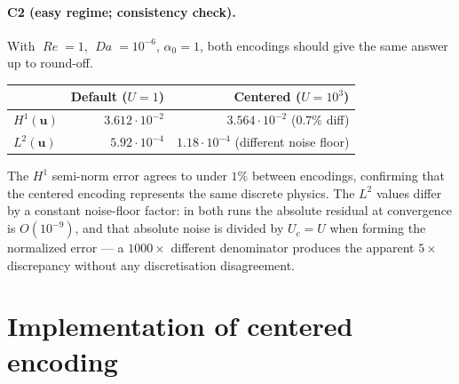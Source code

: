 \documentclass[11pt]{article}
\newcommand{\Reyn}{\operatorname{\mathit{Re}}}
\newcommand{\Damk}{\operatorname{\mathit{Da}}}
\begin{document}
\paragraph{C2 (easy regime; consistency check).}
With $\Reyn=1$, $\Damk=10^{-6}$, $\alpha_0=1$, both encodings should give
the same answer up to round-off.
\begin{center}
\begin{tabular}{lrr}
  \toprule
  & Default ($U=1$) & Centered ($U=10^{3}$) \\
  \midrule
  $H^{1}(\boldsymbol{u})$ & $3.612\cdot10^{-2}$ & $3.564\cdot10^{-2}$ \quad ($0.7\%$ diff) \\
  $L^{2}(\boldsymbol{u})$ & $5.92\cdot10^{-4}$  & $1.18\cdot10^{-4}$  \quad (different noise floor) \\
  \bottomrule
\end{tabular}
\end{center}
\noindent The $H^{1}$ semi-norm error agrees to under $1\%$ between
encodings, confirming that the centered encoding represents the same
discrete physics. The $L^{2}$ values differ by a constant noise-floor
factor: in both runs the absolute residual at convergence is $O(10^{-9})$,
and that absolute noise is divided by $U_c = U$ when forming the
normalized error — a $1000\times$ different denominator produces the
apparent $5\times$ discrepancy without any discretisation disagreement.

\section{Implementation of centered encoding}
\label{sec:impl-centered}
\end{document}
